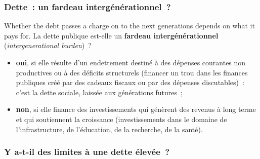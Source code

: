 \subsubsection{Dette~: un fardeau intergénérationnel~?}

Whether the debt passes a charge on to the next generations depends on what it
pays for. La dette publique est-elle un \textbf{fardeau intergénérationnel}
(\textit{intergenerational burden})~?
\begin{itemize}
  \item \textbf{oui}, si elle résulte d'un endettement destiné à des dépenses
    courantes non productives ou à des déficits structurels (financer un trou
    dans les finances publiques créé par des cadeaux fiscaux ou par des dépenses
    discutables)~: c'est la dette sociale, laissée aux générations futures~;
  \item \textbf{non}, si elle finance des investissements qui génèrent des
    revenus à long terme et qui soutiennent la croissance (investissements dans
    le domaine de l'infrastructure, de l'éducation, de la recherche, de la
    santé).
\end{itemize}

\subsubsection{Y a-t-il des limites à une dette élevée~?}

